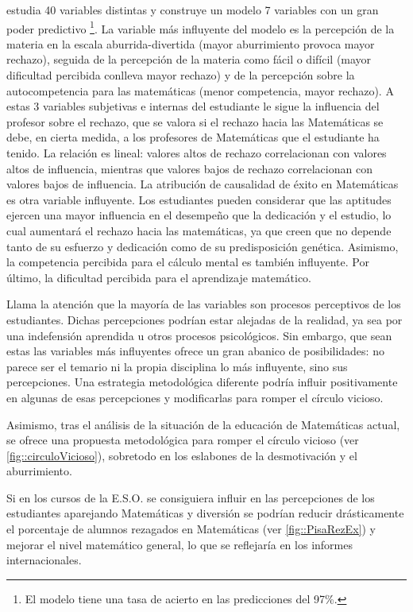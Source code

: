 \cite{ActitudesHaciaMates} estudia 40 variables distintas y construye un modelo 7 variables con un gran poder predictivo 
%
\footnote{El modelo tiene una tasa de acierto en las predicciones del 97\%.}.
%
La variable más influyente del modelo es la percepción de la materia en la escala aburrida-divertida (mayor aburrimiento provoca mayor rechazo), seguida de la percepción de la materia como fácil o difícil (mayor dificultad percibida conlleva mayor rechazo) y de la percepción sobre la autocompetencia para las matemáticas (menor competencia, mayor rechazo).
%
A estas 3 variables subjetivas e internas del estudiante le sigue la influencia del profesor sobre el rechazo, que se valora si el rechazo hacia las Matemáticas se debe, en cierta medida, a los profesores de Matemáticas que el estudiante ha tenido.
%
La relación es lineal: valores altos de rechazo correlacionan con valores altos de influencia, mientras que valores bajos de rechazo correlacionan con valores bajos de influencia.
%
La atribución de causalidad de éxito en Matemáticas es otra variable influyente. 
%
Los estudiantes pueden considerar que las aptitudes ejercen una mayor influencia en el desempeño que la dedicación y el estudio, lo cual aumentará el rechazo hacia las matemáticas, ya que creen que no depende tanto de su esfuerzo y dedicación como de su predisposición genética.
%
Asimismo, la competencia percibida para el cálculo mental es también influyente.
%
Por último, la dificultad percibida para el aprendizaje matemático.


Llama la atención que la mayoría de las variables son procesos perceptivos de los estudiantes.
%
Dichas percepciones podrían estar alejadas de la realidad, ya sea por una indefensión aprendida u otros procesos psicológicos.
%
Sin embargo, que sean estas las variables más influyentes ofrece un gran abanico de posibilidades: no parece ser el temario ni la propia disciplina lo más influyente, sino sus percepciones.
%
Una estrategia metodológica diferente podría influir positivamente en algunas de esas percepciones y modificarlas para romper el círculo vicioso.

Asimismo, tras el análisis de la situación de la educación de Matemáticas actual,
%
se ofrece una propuesta metodológica para romper el círculo vicioso (ver \ref{fig::circuloVicioso}), sobretodo en los eslabones de la desmotivación y el aburrimiento.

Si en los cursos de la E.S.O. se consiguiera influir en las percepciones de los estudiantes aparejando Matemáticas y diversión se podrían reducir drásticamente el porcentaje de alumnos rezagados en Matemáticas (ver \ref{fig::PisaRezEx}) y mejorar el nivel matemático general, lo que se reflejaría en los informes internacionales.

